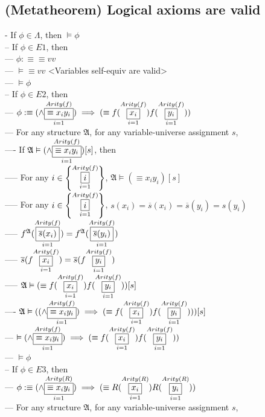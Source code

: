 \documentclass{book}
\newcommand{\is}{:\equiv}
\newcommand{\means}[2]{#1^{#2}}
\newcommand{\extend}[1]{\overline{#1}}
\newcommand{\set}[1]{\left\{ #1 \right\}}
\newcommand{\vdc}[3]{\underset{#2}{\overset{#3}{\fbox{$#1$}}}}
\begin{document}
\subsection{(Metatheorem) Logical axioms are valid} %
	- If $\phi \in \Lambda$, then $\vDash \phi$ \\
		-- If $\phi \in E1$, then \\
			--- $\phi \is \equiv v v$ \\
			--- $\vDash \equiv v v$ <Variables self-equiv are valid> \\
			--- $\vDash \phi$ \\
		-- If $\phi \in E2$, then \\
			--- $\phi \is (\land \vdc{\equiv x_i y_i}{i=1}{Arity(f)}) \implies (\equiv f(\vdc{x_i}{i=1}{Arity(f)}) f(\vdc{y_i}{i=1}{Arity(f)}))$ \\
			--- For any structure $\mathfrak{A}$, for any variable-universe assignment $s$, \\
				---- If $\mathfrak{A} \vDash (\land \vdc{\equiv x_i y_i}{i=1}{Arity(f)})[s]$, then \\
					----- For any $i \in \set{\vdc{i}{i=1}{Arity(f)}}$, $\mathfrak{A} \vDash (\equiv x_i y_i)[s]$ \\
					----- For any $i \in \set{\vdc{i}{i=1}{Arity(f)}}$, $s(x_i) = \extend{s}(x_i) = \extend{s}(y_i) = s(y_i)$ \\
					----- $\means{f}{\mathfrak{A}}(\vdc{\extend{s}(x_i)}{i=1}{Arity(f)}) = \means{f}{\mathfrak{A}}(\vdc{\extend{s}(y_i)}{i=1}{Arity(f)})$ \\
					----- $\extend{s}(f \vdc{x_i}{i=1}{Arity(f)}) = \extend{s}(f \vdc{y_i}{i=1}{Arity(f)})$ \\
					----- $\mathfrak{A} \vDash (\equiv f(\vdc{x_i}{i=1}{Arity(f)}) f(\vdc{y_i}{i=1}{Arity(f)}))[s]$ \\
				---- $\mathfrak{A} \vDash ((\land \vdc{\equiv x_i y_i}{i=1}{Arity(f)}) \implies (\equiv f(\vdc{x_i}{i=1}{Arity(f)}) f(\vdc{y_i}{i=1}{Arity(f)})))[s]$ \\
			--- $\vDash (\land \vdc{\equiv x_i y_i}{i=1}{Arity(f)}) \implies (\equiv f(\vdc{x_i}{i=1}{Arity(f)}) f(\vdc{y_i}{i=1}{Arity(f)}))$ \\
			--- $\vDash \phi$ \\
		-- If $\phi \in E3$, then \\
			--- $\phi \is (\land \vdc{\equiv x_i y_i}{i=1}{Arity(R)}) \implies (\equiv R(\vdc{x_i}{i=1}{Arity(R)}) R(\vdc{y_i}{i=1}{Arity(R)}))$ \\
			--- For any structure $\mathfrak{A}$, for any variable-universe assignment $s$, \\
\end{document}
